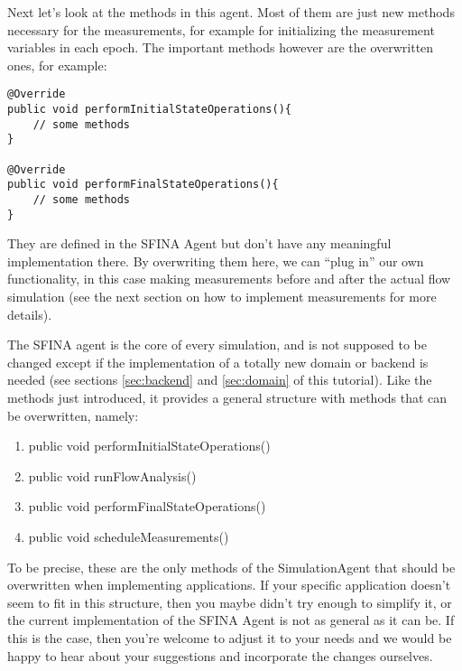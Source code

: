 \documentclass[11pt,fleqn]{book} %
\begin{document}
Next let’s look at the methods in this agent. Most of them are just new methods necessary for the measurements, for example for initializing the measurement variables in each epoch. The important methods however are the overwritten ones, for example:
\begin{lstlisting}[frame=single]
@Override
public void performInitialStateOperations(){
	// some methods
}
    
@Override
public void performFinalStateOperations(){
	// some methods
}
\end{lstlisting}
They are defined in the SFINA Agent but don’t have any meaningful implementation there. By overwriting them here, we can “plug in” our own functionality, in this case making measurements before and after the actual flow simulation (see the next section on how to implement measurements for more details).

The SFINA agent is the core of every simulation, and is not supposed to be changed except if the implementation of a totally new domain or backend is needed (see sections \ref{sec:backend} and \ref{sec:domain} of this tutorial). Like the methods just introduced, it provides a general structure with methods that can be overwritten, namely:
\begin{enumerate}
	\item public void performInitialStateOperations()
	\item public void runFlowAnalysis()
	\item public void performFinalStateOperations()
	\item public void scheduleMeasurements()
\end{enumerate}

To be precise, these are the only methods of the SimulationAgent that should be overwritten when implementing applications. If your specific application doesn’t seem to fit in this structure, then you maybe didn’t try enough to simplify it, or the current implementation of the SFINA Agent is not as general as it can be. If this is the case, then you’re welcome to adjust it to your needs and we would be happy to hear about your suggestions and incorporate the changes ourselves.
\end{document}
